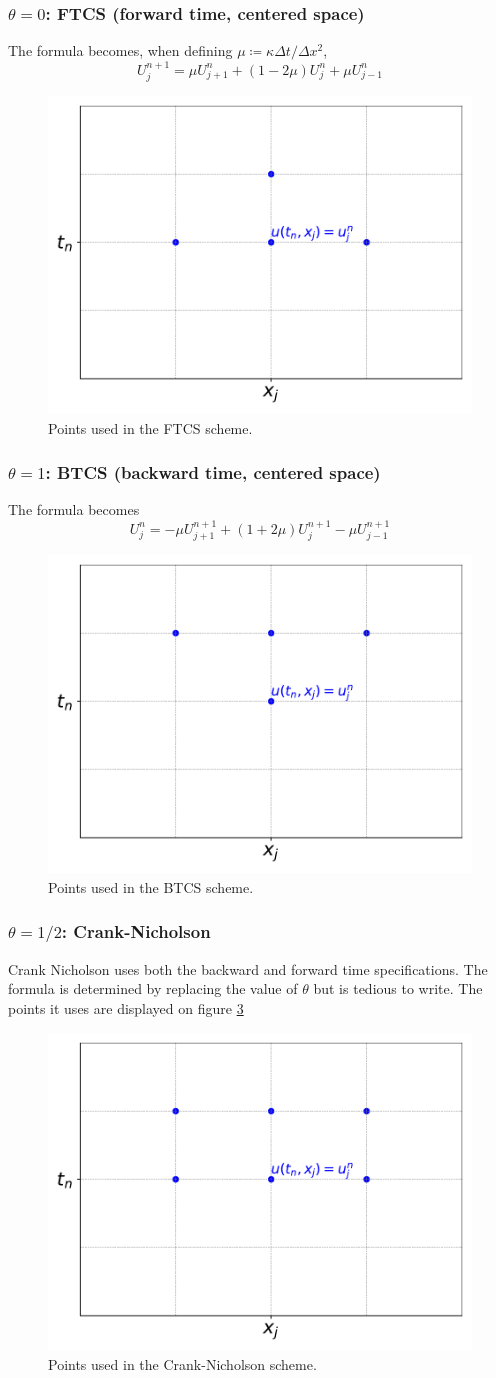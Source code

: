 \documentclass[12pt, openany]{report}
\theoremstyle{definition}
\begin{document}
\subsubsection{$\theta=0$: FTCS (forward time, centered space)}
The formula becomes, when defining $\mu \coloneqq \kappa \Delta t/\Delta x^2$,
\begin{equation}
	U_j^{n+1} = \mu U_{j+1}^n + (1-2\mu)U_j^n + \mu U_{j-1}^n 
\end{equation}
\begin{figure}[H]
	\centering
	\includegraphics[width=.4\textwidth]{img/FTCS.pdf}
	\caption{Points used in the FTCS scheme.}
	\label{fig:FTCS}
\end{figure}
\subsubsection{$\theta=1$: BTCS (backward time, centered space)}
The formula becomes
\begin{equation}
	U_j^{n} = -\mu U_{j+1}^{n+1} + (1+2\mu)U_j^{n+1} - \mu U_{j-1}^{n+1} 
\end{equation}
\begin{figure}[H]
	\centering
	\includegraphics[width=.4\textwidth]{img/BTCS.pdf}
	\caption{Points used in the BTCS scheme.}
	\label{fig:BTCS}
\end{figure}
\subsubsection{$\theta=1/2$: Crank-Nicholson}
Crank Nicholson uses both the backward and forward time specifications. The formula is determined by replacing the value of $\theta$ but is tedious to write. The points it uses are displayed on figure \ref{fig:CN}
\begin{figure}[H]
	\centering
	\includegraphics[width=.4\textwidth]{img/CN.pdf}
	\caption{Points used in the Crank-Nicholson scheme.}
	\label{fig:CN}
\end{figure}
\end{document}
